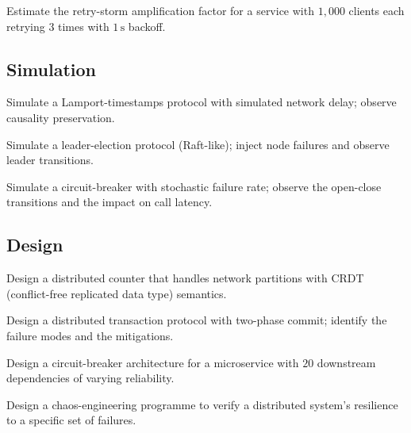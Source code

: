 \begin{exercise}
Estimate the retry-storm amplification factor for a service with $1{,}000$ clients each retrying $3$ times with $1\,\text{s}$ backoff.
\end{exercise}

\subsection*{Simulation}

\begin{exercise}
Simulate a Lamport-timestamps protocol with simulated network delay; observe causality preservation.
\end{exercise}

\begin{exercise}
Simulate a leader-election protocol (Raft-like); inject node failures and observe leader transitions.
\end{exercise}

\begin{exercise}
Simulate a circuit-breaker with stochastic failure rate; observe the open-close transitions and the impact on call latency.
\end{exercise}

\subsection*{Design}

\begin{exercise}
Design a distributed counter that handles network partitions with CRDT (conflict-free replicated data type) semantics.
\end{exercise}

\begin{exercise}
Design a distributed transaction protocol with two-phase commit; identify the failure modes and the mitigations.
\end{exercise}

\begin{exercise}
Design a circuit-breaker architecture for a microservice with $20$ downstream dependencies of varying reliability.
\end{exercise}

\begin{exercise}
Design a chaos-engineering programme to verify a distributed system's resilience to a specific set of failures.
\end{exercise}


